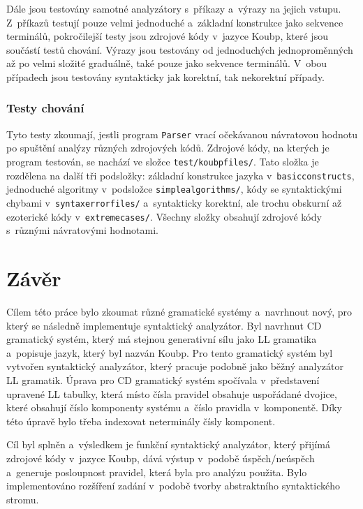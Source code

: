 Dále jsou testovány samotné analyzátory s~příkazy a~výrazy na jejich vstupu.
Z~příkazů testují pouze velmi jednoduché a~základní konstrukce jako sekvence terminálů, pokročilejší testy jsou zdrojové kódy v~jazyce Koubp, které jsou součástí testů chování.
Výrazy jsou testovány od jednoduchých jednoproměnných až po velmi složité graduálně, také pouze jako sekvence terminálů.
V~obou případech jsou testovány syntakticky jak korektní, tak nekorektní případy.

\subsection*{Testy chování}
Tyto testy zkoumají, jestli program \texttt{Parser} vrací očekávanou návratovou hodnotu po spuštění analýzy různých zdrojových kódů.
Zdrojové kódy, na kterých je program testován, se nachází ve složce \texttt{test/koubp\textunderscore files/}.
Tato složka je rozdělena na další tři podsložky: základní konstrukce jazyka v~\texttt{basic\textunderscore constructs}, jednoduché algoritmy v~podsložce \texttt{simple\textunderscore algorithms/}, kódy se syntaktickými chybami v~\texttt{syntax\textunderscore error\textunderscore files/} a~syntakticky korektní, ale trochu obskurní až ezoterické kódy v~\texttt{extreme\textunderscore cases/}.
Všechny složky obsahují zdrojové kódy s~různými návratovými hodnotami.

\chapter{Závěr}
Cílem této práce bylo zkoumat různé gramatické systémy a~navrhnout nový, pro který se následně implementuje syntaktický analyzátor.
Byl navrhnut CD gramatický systém, který má stejnou generativní sílu jako LL gramatika a~popisuje jazyk, který byl nazván Koubp.
Pro tento gramatický systém byl vytvořen syntaktický analyzátor, který pracuje podobně jako běžný analyzátor LL gramatik.
Úprava pro CD gramatický systém spočívala v~představení upravené LL tabulky, která místo čísla pravidel obsahuje uspořádané dvojice, které obsahují číslo komponenty systému a~číslo pravidla v~komponentě.
Díky této úpravě bylo třeba indexovat neterminály čísly komponent.

Cíl byl splněn a~výsledkem je funkční syntaktický analyzátor, který přijímá zdrojové kódy v~jazyce Koubp, dává výstup v~podobě úspěch/neúspěch a~generuje posloupnost pravidel, která byla pro analýzu použita.
Bylo implementováno rozšíření zadání v~podobě tvorby abstraktního syntaktického stromu.

